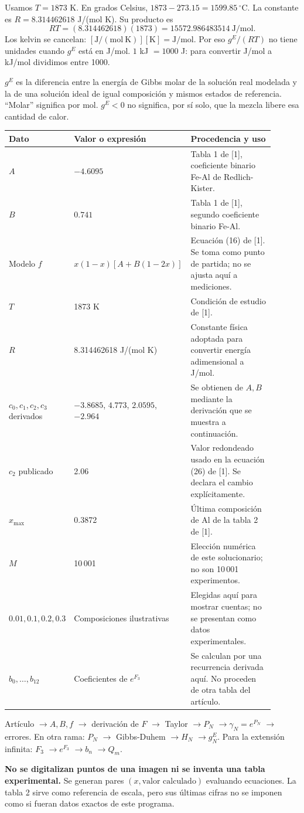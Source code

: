 Usamos $T=1873$ K. En grados Celsius, $1873-273.15=1599.85\,{}^\circ$C. La constante es $R=8.314462618$ J/(mol K). Su producto es
\[
RT=(8.314462618)(1873)=15572.986483514\ \mathrm{J/mol}.
\]
Los kelvin se cancelan: $[\mathrm{J/(mol\ K)}][\mathrm K]=\mathrm{J/mol}$. Por eso $g^E/(RT)$ no tiene unidades cuando $g^E$ está en J/mol. $1$ kJ $=1000$ J: para convertir J/mol a kJ/mol dividimos entre 1000.

$g^E$ es la diferencia entre la energía de Gibbs molar de la solución real modelada y la de una solución ideal de igual composición y mismos estados de referencia. ``Molar'' significa por mol. $g^E<0$ no significa, por sí solo, que la mezcla libere esa cantidad de calor.

\begin{longtable}{p{0.23\linewidth}p{0.31\linewidth}p{0.36\linewidth}}
\toprule Dato & Valor o expresión & Procedencia y uso\\\midrule\endhead
$A$ & $-4.6095$ & Tabla 1 de [1], coeficiente binario Fe-Al de Redlich-Kister.\\
$B$ & $0.741$ & Tabla 1 de [1], segundo coeficiente binario Fe-Al.\\
Modelo $f$ & $x(1-x)[A+B(1-2x)]$ & Ecuación (16) de [1]. Se toma como punto de partida; no se ajusta aquí a mediciones.\\
$T$ & 1873 K & Condición de estudio de [1].\\
$R$ & 8.314462618 J/(mol K) & Constante física adoptada para convertir energía adimensional a J/mol.\\
$c_0,c_1,c_2,c_3$ derivados & $-3.8685$, $4.773$, $2.0595$, $-2.964$ & Se obtienen de $A,B$ mediante la derivación que se muestra a continuación.\\
$c_2$ publicado & 2.06 & Valor redondeado usado en la ecuación (26) de [1]. Se declara el cambio explícitamente.\\
$x_{\max}$ & 0.3872 & Última composición de Al de la tabla 2 de [1].\\
$M$ & 10\,001 & Elección numérica de este solucionario; no son 10\,001 experimentos.\\
$0.01,0.1,0.2,0.3$ & Composiciones ilustrativas & Elegidas aquí para mostrar cuentas; no se presentan como datos experimentales.\\
$b_0,\ldots,b_{12}$ & Coeficientes de $e^{F_3}$ & Se calculan por una recurrencia derivada aquí. No proceden de otra tabla del artículo.\\\bottomrule
\end{longtable}
Artículo $\rightarrow A,B,f$ $\rightarrow$ derivación de $F$ $\rightarrow$ Taylor $\rightarrow P_N$ $\rightarrow \gamma_N=e^{P_N}$ $\rightarrow$ errores. En otra rama: $P_N$ $\rightarrow$ Gibbs-Duhem $\rightarrow H_N$ $\rightarrow g_N^E$. Para la extensión infinita: $F_3$ $\rightarrow e^{F_3}$ $\rightarrow b_n$ $\rightarrow Q_m$.

\textbf{No se digitalizan puntos de una imagen ni se inventa una tabla experimental.} Se generan pares $(x,\text{valor calculado})$ evaluando ecuaciones. La tabla 2 sirve como referencia de escala, pero sus últimas cifras no se imponen como si fueran datos exactos de este programa.
